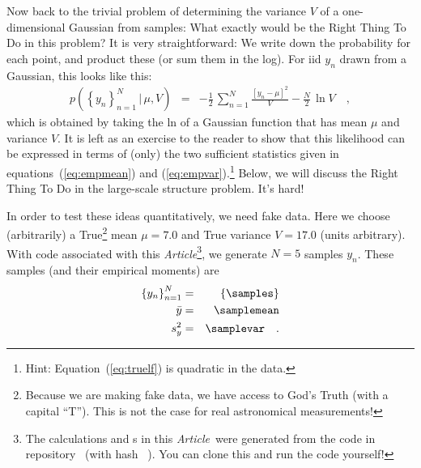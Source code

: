 \documentclass[12pt, letterpaper, preprint]{aastex}
\newcommand{\setof}[1]{\left\{{#1}\right\}}
\newcommand{\given}{\,|\,}
\newcommand{\documentname}{\textsl{Article}}
\begin{document}
Now back to the trivial problem of determining the variance $V$ of a
one-dimensional Gaussian from samples:
What exactly would be the Right Thing To Do in this problem?
It is very straightforward:
We write down the probability for each point, and product these
(or sum them in the log).
For iid $y_n$ drawn from a Gaussian, this looks like this:
\begin{eqnarray}
p(\setof{y_n}_{n=1}^N\given \mu,V) &=& -\frac{1}{2}\,\sum_{n=1}^N \frac{[y_n - \mu]^2}{V} - \frac{N}{2}\,\ln V
\label{eq:truelf}\quad ,
\end{eqnarray}
which is obtained by taking the ln of a Gaussian function that has
mean $\mu$ and variance $V$.
It is left as an exercise to the reader to show that this likelihood
can be expressed in terms of (only) the two sufficient statistics given
in equations~(\ref{eq:empmean}) and (\ref{eq:empvar}).\footnote{Hint:
  Equation~(\ref{eq:truelf}) is quadratic in the data.}
Below, we will discuss the Right Thing To Do in the large-scale
structure problem. It's hard!

In order to test these ideas quantitatively, we need fake data.
Here we choose (arbitrarily) a True\footnote{Because we are making
  fake data, we have access to God's Truth (with a capital
  ``T''). This is not the case for real astronomical measurements!}
mean $\mu=7.0$ and True variance $V=17.0$ (units arbitrary).
With code associated with this \documentname\footnote{The calculations
  and \figurename s in this \documentname\ were generated from the code in
  repository \giturl\ (with hash \texttt{\githash~\gitdate}). You can
  clone this and run the code yourself!}, we generate $N=5$ samples
$y_n$.
These samples (and their empirical moments) are
\begin{eqnarray}
\setof{y_n}_{n=1}^N &=& \setof{\samples}
\\
\bar{y} &=& \samplemean
\\
s^2_y &=& \samplevar
\quad .
\end{eqnarray}
\end{document}
